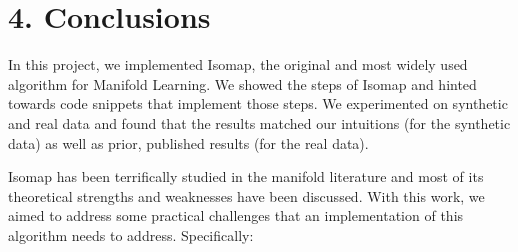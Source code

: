 \documentclass[a4paper,12pt]{report}
\begin{document}
\section*{4. Conclusions}

In this project, we implemented Isomap, the original and most widely used algorithm for Manifold Learning. We showed the steps of Isomap
and hinted towards code snippets that implement those steps. We experimented on synthetic and real data and found that the results matched our
intuitions (for the synthetic data) as well as prior, published results (for the real data).

Isomap has been terrifically studied in the manifold literature and most of its theoretical strengths and weaknesses have been discussed. With this work,
we aimed to address some practical challenges that an implementation of this algorithm needs to address. Specifically:
\end{document}
